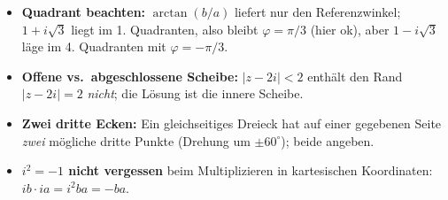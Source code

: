 \begin{achtung}
\begin{itemize}
  \item \textbf{Quadrant beachten:} $\arctan(b/a)$ liefert nur den
        Referenzwinkel; $1+i\sqrt3$ liegt im 1. Quadranten, also bleibt
        $\varphi=\pi/3$ (hier ok), aber $1-i\sqrt3$ läge im 4. Quadranten
        mit $\varphi=-\pi/3$.
  \item \textbf{Offene vs.\ abgeschlossene Scheibe:} $|z-2i|<2$ enthält den
        Rand $|z-2i|=2$ \emph{nicht}; die Lösung ist die innere Scheibe.
  \item \textbf{Zwei dritte Ecken:} Ein gleichseitiges Dreieck hat auf einer
        gegebenen Seite \emph{zwei} mögliche dritte Punkte (Drehung um
        $\pm60^\circ$); beide angeben.
  \item \textbf{$i^2=-1$ nicht vergessen} beim Multiplizieren in kartesischen
        Koordinaten: $ib\cdot ia=i^2 ba=-ba$.
\end{itemize}
\end{achtung}
